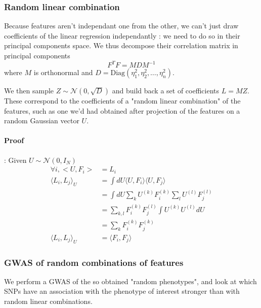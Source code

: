 \documentclass{article}
\begin{document}
\subsubsection{Random linear combination}

Because features aren't independant one from the other, we can't just draw coefficients of the linear regression independantly : we need to do so in their principal components space. We thus decompose their correlation matrix in principal components
\begin{equation}
F^TF = MDM^{-1}
\end{equation}
where $M$ is orthonormal and $D = \text{Diag}(\eta_1^2,\eta_2^2,\dots,\eta_n^2)$.

We then sample $Z \sim \mathcal{N}(0,\sqrt{D})$ and build back a set of coefficients $L = MZ$. These correspond to the coefficients of a "random linear combination" of the features, such as one we'd had  obtained after projection of the features on a random Gaussian vector $U$.

\paragraph{Proof} : Given $U \sim \mathcal{N}(0,I_N)$
\begin{equation}
\begin{split}
\forall i, <U,F_i> &= L_i \\
\langle L_i,L_j \rangle_U &= \int dU \langle U,F_i \rangle  \langle U,F_j \rangle \\
&= \int dU \sum_k U^{(k)} F_i^{(k)} \sum_l U^{(l)} F_j^{(l)} \\
&= \sum_{k,l} F_i^{(k)} F_j^{(l)} \int U^{(k)} U^{(l)} dU \\
&= \sum_k F_i^{(k)} F_j^{(k)} \\
\langle L_i,L_j \rangle_U &= \langle F_i,F_j \rangle
\end{split}
\end{equation}

\subsubsection{GWAS of random combinations of features}

We perform a GWAS of the so obtained "random phenotypes", and look at which SNPs have an association with the phenotype of interest stronger than with random linear combinations.
\end{document}
